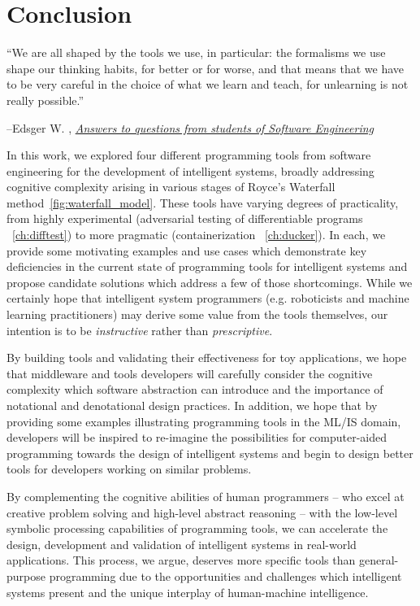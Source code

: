 \chapter{Conclusion}\label{ch:conclusion}
\setlength{\epigraphwidth}{0.90\textwidth}
\epigraph{``We are all shaped by the tools we use, in particular: the formalisms we use shape our thinking habits, for better or for worse, and that means that we have to be very careful in the choice of what we learn and teach, for unlearning is not really possible.''}{\begin{flushright}--Edsger W. \citet{dijkstra2000answers}, \href{https://www.cs.utexas.edu/~EWD/transcriptions/EWD13xx/EWD1305.html}{\textit{Answers to questions from students of Software Engineering}}\end{flushright}}

In this work, we explored four different programming tools from software engineering for the development of intelligent systems, broadly addressing cognitive complexity arising in various stages of Royce's Waterfall method~\autoref{fig:waterfall_model}. These tools have varying degrees of practicality, from highly experimental (adversarial testing of differentiable programs ~\autoref{ch:difftest}) to more pragmatic (containerization ~\autoref{ch:ducker}). In each, we provide some motivating examples and use cases which demonstrate key deficiencies in the current state of programming tools for intelligent systems and propose candidate solutions which address a few of those shortcomings. While we certainly hope that intelligent system programmers (e.g. roboticists and machine learning practitioners) may derive some value from the tools themselves, our intention is to be \textit{instructive} rather than \textit{prescriptive}.

By building tools and validating their effectiveness for toy applications, we hope that middleware and tools developers will carefully consider the cognitive complexity which software abstraction can introduce and the importance of notational and denotational design practices. In addition, we hope that by providing some examples illustrating programming tools in the ML/IS domain, developers will be inspired to re-imagine the possibilities for computer-aided programming towards the design of intelligent systems and begin to design better tools for developers working on similar problems.

By complementing the cognitive abilities of human programmers -- who excel at creative problem solving and high-level abstract reasoning -- with the low-level symbolic processing capabilities of programming tools, we can accelerate the design, development and validation of intelligent systems in real-world applications. This process, we argue, deserves more specific tools than general-purpose programming due to the opportunities and challenges which intelligent systems present and the unique interplay of human-machine intelligence.

